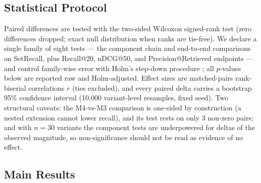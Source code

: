 \documentclass[sigconf,screen]{acmart}
\begin{document}
\subsection{Statistical Protocol}
\label{sec:stats}

Paired differences are tested with the two-sided Wilcoxon signed-rank test
\cite{wilcoxon1945individual} (zero differences dropped; exact null
distribution when ranks are tie-free). We declare a single family of eight
tests --- the component chain and end-to-end comparisons on SetRecall,
plus Recall@20, nDCG@50, and Precision@Retrieved endpoints --- and control
family-wise error with Holm's step-down procedure \cite{holm1979simple};
all $p$-values below are reported raw and Holm-adjusted. Effect sizes are
matched-pairs rank-biserial correlations $r$ (ties excluded), and every
paired delta carries a bootstrap 95\% confidence interval (10{,}000
variant-level resamples, fixed seed). Two structural caveats: the M4-vs-M3
comparison is one-sided by construction (a nested extension cannot lower
recall), and its test rests on only 3 non-zero pairs; and with $n{=}30$
variants the component tests are underpowered for deltas of the observed
magnitude, so non-significance should not be read as evidence of no
effect.

\subsection{Main Results}
\label{sec:main}
\end{document}
